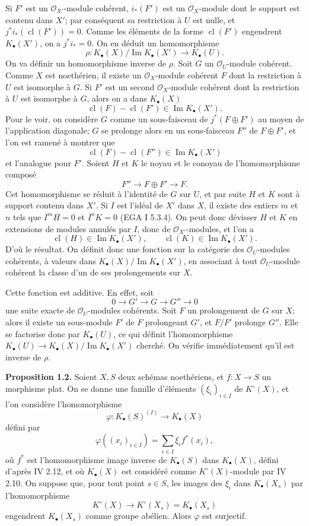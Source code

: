 \documentclass[11pt]{article}
\newcommand{\cl}{\operatorname{cl}}
\begin{document}
Si $F'$ est un $\mathcal O_{X'}$-module cohérent, $i_*(F')$ est un $\mathcal O_X$-module dont le support est contenu dans $X'$; par conséquent sa restriction à $U$ est nulle, et $j^*i_*(\cl(F'))=0$. Comme les éléments de la forme $\cl(F')$ engendrent $K_\bullet(X')$, on a $j^*i_*=0$. On en déduit un homomorphisme
\[
 \rho:K_\bullet(X)/\operatorname{Im}K_\bullet(X')\longrightarrow K_\bullet(U).
\]
On va définir un homomorphisme inverse de $\rho$. Soit $G$ un $\mathcal O_U$-module cohérent. Comme $X$ est noethérien, il existe un $\mathcal O_X$-module cohérent $F$ dont la restriction à $U$ est isomorphe à $G$. Si $F'$ est un second $\mathcal O_X$-module cohérent dont la restriction à $U$ est isomorphe à $G$, alors on a dans $K_\bullet(X)$
\[
 \cl(F)-\cl(F')\in \operatorname{Im}K_\bullet(X').
\]
Pour le voir, on considère $G$ comme un sous-faisceau de $j^*(F\oplus F')$ au moyen de l'application diagonale; $G$ se prolonge alors en un sous-faisceau $F''$ de $F\oplus F'$, et l'on est ramené à montrer que
\[
 \cl(F)-\cl(F'')\in \operatorname{Im}K_\bullet(X')
\]
et l'analogue pour $F'$. Soient $H$ et $K$ le noyau et le conoyau de l'homomorphisme composé
\[
F''\longrightarrow F\oplus F'\longrightarrow F.
\]
Cet homomorphisme se réduit à l'identité de $G$ sur $U$, et par suite $H$ et $K$ sont à support contenu dans $X'$. Si $I$ est l'idéal de $X'$ dans $X$, il existe des entiers $m$ et $n$ tels que $I^mH=0$ et $I^nK=0$ (EGA I 5.3.4). On peut donc dévisser $H$ et $K$ en extensions de modules annulés par $I$, donc de $\mathcal O_{X'}$-modules, et l'on a
\[
\cl(H)\in \operatorname{Im}K_\bullet(X'),\qquad
\cl(K)\in \operatorname{Im}K_\bullet(X').
\]
D'où le résultat. On définit donc une fonction sur la catégorie des $\mathcal O_U$-modules cohérents, à valeurs dans $K_\bullet(X)/\operatorname{Im}K_\bullet(X')$, en associant à tout $\mathcal O_U$-module cohérent la classe d'un de ses prolongements sur $X$.

Cette fonction est additive. En effet, soit
\[
0\longrightarrow G'\longrightarrow G\longrightarrow G''\longrightarrow 0
\]
une suite exacte de $\mathcal O_U$-modules cohérents. Soit $F$ un prolongement de $G$ sur $X$; alors il existe un sous-module $F'$ de $F$ prolongeant $G'$, et $F/F'$ prolonge $G''$. Elle se factorise donc par $K_\bullet(U)$, ce qui définit l'homomorphisme $K_\bullet(U)\to K_\bullet(X)/\operatorname{Im}K_\bullet(X')$ cherché. On vérifie immédiatement qu'il est inverse de $\rho$.

\textbf{Proposition 1.2.} Soient $X,S$ deux schémas noethériens, et $f:X\to S$ un morphisme plat. On se donne une famille d'éléments $(\xi_i)_{i\in I}$ de $K^\circ(X)$, et l'on considère l'homomorphisme
\[
\varphi:K_\bullet(S)^{(I)}\longrightarrow K_\bullet(X)
\]
défini par
\[
\varphi((x_i)_{i\in I})=\sum_{i\in I}\xi_i f^*(x_i),
\]
où $f^*$ est l'homomorphisme image inverse de $K_\bullet(S)$ dans $K_\bullet(X)$, défini d'après IV 2.12, et où $K_\bullet(X)$ est considéré comme $K^\circ(X)$-module par IV 2.10. On suppose que, pour tout point $s\in S$, les images des $\xi_i$ dans $K_\bullet(X_s)$ par l'homomorphisme
\[
K^\circ(X)\longrightarrow K^\circ(X_s)=K_\bullet(X_s)
\]
engendrent $K_\bullet(X_s)$ comme groupe abélien. Alors $\varphi$ est surjectif.
\end{document}
